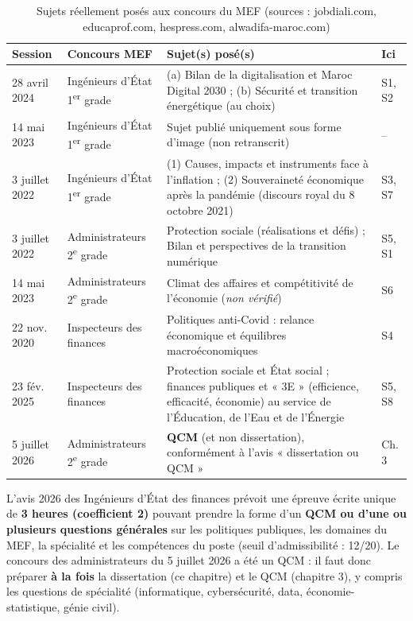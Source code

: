 \begin{table}[H]
\centering
\small
\begin{tabular}{|p{2.6cm}|p{3.3cm}|p{8.2cm}|p{1.2cm}|}
\hline
\rowcolor{gray!20} \textbf{Session} & \textbf{Concours MEF} & \textbf{Sujet(s) posé(s)} & \textbf{Ici} \\ \hline
28 avril 2024 & Ingénieurs d'État 1\textsuperscript{er} grade & (a) Bilan de la digitalisation et Maroc Digital 2030 ; (b) Sécurité et transition énergétique (au choix) & S1, S2 \\ \hline
14 mai 2023 & Ingénieurs d'État 1\textsuperscript{er} grade & Sujet publié uniquement sous forme d'image (non retranscrit) & -- \\ \hline
3 juillet 2022 & Ingénieurs d'État 1\textsuperscript{er} grade & (1) Causes, impacts et instruments face à l'inflation ; (2) Souveraineté économique après la pandémie (discours royal du 8 octobre 2021) & S3, S7 \\ \hline
3 juillet 2022 & Administrateurs 2\textsuperscript{e} grade & Protection sociale (réalisations et défis) ; Bilan et perspectives de la transition numérique & S5, S1 \\ \hline
14 mai 2023 & Administrateurs 2\textsuperscript{e} grade & Climat des affaires et compétitivité de l'économie (\textit{non vérifié}) & S6 \\ \hline
22 nov. 2020 & Inspecteurs des finances & Politiques anti-Covid : relance économique et équilibres macroéconomiques & S4 \\ \hline
23 fév. 2025 & Inspecteurs des finances & Protection sociale et État social ; finances publiques et « 3E » (efficience, efficacité, économie) au service de l'Éducation, de l'Eau et de l'Énergie & S5, S8 \\ \hline
5 juillet 2026 & Administrateurs 2\textsuperscript{e} grade & \textbf{QCM} (et non dissertation), conformément à l'avis « dissertation ou QCM » & Ch. 3 \\ \hline
\end{tabular}
\caption{Sujets réellement posés aux concours du MEF (sources : jobdiali.com, educaprof.com, hespress.com, alwadifa-maroc.com)}
\end{table}

\begin{tcolorbox}[colback=red!4!white,colframe=red!60!black,title=\textbf{Alerte format --- Session 2026}]
L'avis 2026 des Ingénieurs d'État des finances prévoit une épreuve écrite unique de \textbf{3 heures (coefficient 2)} pouvant prendre la forme d'un \textbf{QCM ou d'une ou plusieurs questions générales} sur les politiques publiques, les domaines du MEF, la spécialité et les compétences du poste (seuil d'admissibilité : 12/20). Le concours des administrateurs du 5 juillet 2026 a été un QCM : il faut donc préparer \textbf{à la fois} la dissertation (ce chapitre) et le QCM (chapitre 3), y compris les questions de spécialité (informatique, cybersécurité, data, économie-statistique, génie civil).
\end{tcolorbox}


